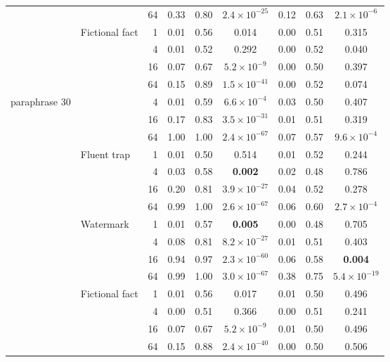 \begin{tabular}{llrcccccc}
 &  & 64 & 0.33 & 0.80 & \textbf{$2.4{\times}10^{-25}$} & 0.12 & 0.63 & \textbf{$2.1{\times}10^{-6}$} \\
 & Fictional fact & 1 & 0.01 & 0.56 & 0.014 & 0.00 & 0.51 & 0.315 \\
 &  & 4 & 0.01 & 0.52 & 0.292 & 0.00 & 0.52 & 0.040 \\
 &  & 16 & 0.07 & 0.67 & \textbf{$5.2{\times}10^{-9}$} & 0.00 & 0.50 & 0.397 \\
 &  & 64 & 0.15 & 0.89 & \textbf{$1.5{\times}10^{-41}$} & 0.00 & 0.52 & 0.074 \\
\midrule
paraphrase 30%
 &  & 4 & 0.01 & 0.59 & \textbf{$6.6{\times}10^{-4}$} & 0.03 & 0.50 & 0.407 \\
 &  & 16 & 0.17 & 0.83 & \textbf{$3.5{\times}10^{-31}$} & 0.01 & 0.51 & 0.319 \\
 &  & 64 & 1.00 & 1.00 & \textbf{$2.4{\times}10^{-67}$} & 0.07 & 0.57 & \textbf{$9.6{\times}10^{-4}$} \\
 & Fluent trap & 1 & 0.01 & 0.50 & 0.514 & 0.01 & 0.52 & 0.244 \\
 &  & 4 & 0.03 & 0.58 & \textbf{0.002} & 0.02 & 0.48 & 0.786 \\
 &  & 16 & 0.20 & 0.81 & \textbf{$3.9{\times}10^{-27}$} & 0.04 & 0.52 & 0.278 \\
 &  & 64 & 0.99 & 1.00 & \textbf{$2.6{\times}10^{-67}$} & 0.06 & 0.60 & \textbf{$2.7{\times}10^{-4}$} \\
 & Watermark & 1 & 0.01 & 0.57 & \textbf{0.005} & 0.00 & 0.48 & 0.705 \\
 &  & 4 & 0.08 & 0.81 & \textbf{$8.2{\times}10^{-27}$} & 0.01 & 0.51 & 0.403 \\
 &  & 16 & 0.94 & 0.97 & \textbf{$2.3{\times}10^{-60}$} & 0.06 & 0.58 & \textbf{0.004} \\
 &  & 64 & 0.99 & 1.00 & \textbf{$3.0{\times}10^{-67}$} & 0.38 & 0.75 & \textbf{$5.4{\times}10^{-19}$} \\
 & Fictional fact & 1 & 0.01 & 0.56 & 0.017 & 0.01 & 0.50 & 0.496 \\
 &  & 4 & 0.00 & 0.51 & 0.366 & 0.00 & 0.51 & 0.241 \\
 &  & 16 & 0.07 & 0.67 & \textbf{$5.2{\times}10^{-9}$} & 0.01 & 0.50 & 0.496 \\
 &  & 64 & 0.15 & 0.88 & \textbf{$2.4{\times}10^{-40}$} & 0.00 & 0.50 & 0.506 \\
\bottomrule
\end{tabular}

